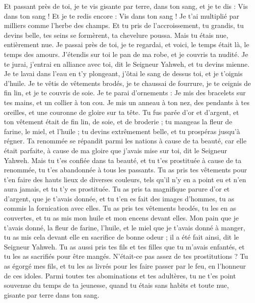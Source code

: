 \begin{multicols}{2}
Et passant près de toi, je te vis gisante par terre, dans ton sang, et je te dis : Vis dans ton sang ! Et je te redis encore : Vis dans ton sang !
Je t'ai multiplié par milliers comme l'herbe des champs. Et tu pris de l’accroissement, tu grandis, tu devins belle, tes seins se formèrent, ta chevelure poussa. Mais tu étais nue, entièrement nue.
Je passai près de toi, je te regardai, et voici, le temps était là, le temps des amours. J'étendis sur toi le pan de ma robe, et je couvris ta nudité. Je te jurai, j'entrai en alliance avec toi, dit le Seigneur Yahweh, et tu devins mienne.
Je te lavai dans l'eau en t'y plongeant, j'ôtai le sang de dessus toi, et je t'oignis d'huile.
Je te vêtis de vêtements brodés, je te chaussai de fourrure, je te ceignis de fin lin, et je te couvris de soie.
Je te parai d'ornements : Je mis des bracelets sur tes mains, et un collier à ton cou.
Je mis un anneau à ton nez, des pendants à tes oreilles, et une couronne de gloire sur ta tête.
Tu fus parée d'or et d'argent, et ton vêtement était de fin lin, de soie, et de broderie ; tu mangeas la fleur de farine, le miel, et l'huile ; tu devins extrêmement belle, et tu prospéras jusqu’à régner.
Ta renommée se répandit parmi les nations à cause de ta beauté, car elle était parfaite, à cause de ma gloire que j'avais mise sur toi, dit le Seigneur Yahweh.
Mais tu t'es confiée dans ta beauté, et tu t'es prostituée à cause de ta renommée, tu t'es abandonnée à tous les passants\FTNT{}.
Tu as pris tes vêtements pour t’en faire des hauts lieux de diverses couleurs, tels qu'il n'y en a point eu et n'en aura jamais, et tu t'y es prostituée.
Tu as pris ta magnifique parure d’or et d’argent, que je t'avais donnée, et tu t'en es fait des images d’hommes, tu as commis la fornication avec elles.
Tu as pris tes vêtements brodés,  tu les en as couvertes, et tu as mis mon huile et mon encens devant elles.
Mon pain que je t'avais donné, la fleur de farine, l'huile, et le miel que je t'avais donné à manger, tu as mis cela devant elle en sacrifice de bonne odeur ; il a été fait ainsi, dit le Seigneur Yahweh.
Tu as aussi pris tes fils et tes filles que tu m'avais enfantés, et tu les as sacrifiés pour être mangés\FTNT{}. N’était-ce pas assez de tes prostitutions ?
Tu as  égorgé mes fils, et tu les as livrés pour les faire passer par le feu, en l'honneur de ces idoles\FTNT{}.
Parmi toutes tes abominations et tes adultères, tu ne t'es point souvenue du temps de ta jeunesse, quand tu étais sans habits et toute nue, gisante par terre dans ton sang.

\end{multicols}
